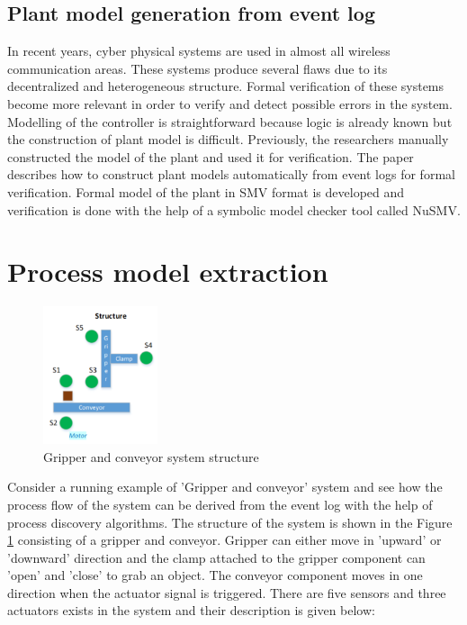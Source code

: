 \documentclass[conference]{IEEEtran}
\begin{document}
\subsection{Plant model generation from event log}

In recent years, cyber physical systems are used in almost all wireless communication areas. These systems produce several flaws due to its decentralized and heterogeneous structure. Formal verification of these systems become more relevant in order to verify and detect possible errors in the system. Modelling of the controller is straightforward because logic is already known but the construction of plant model is difficult. Previously, the researchers manually constructed the model of the plant and used it for verification. The paper \cite{etfapaper} describes how to construct plant models automatically from event logs for formal verification. Formal model of the plant in SMV format is developed and verification is done with the help of a symbolic model checker tool called NuSMV.


\section{Process model extraction}
\label{sec:processmodelextraction}
\begin{figure}[!t]
	\centering
	\includegraphics[width=0.3\textwidth]{images/structure.PNG}
	\caption{Gripper and conveyor system structure}
	\label{fig:structure}
\end{figure}

Consider a running example of  'Gripper and conveyor' system and see how the process flow of the system can be derived from the event log with the help of process discovery algorithms. The structure of the system is shown in the Figure \ref{fig:structure} consisting of a gripper and conveyor. Gripper can either move in 'upward' or 'downward' direction and the clamp attached to the gripper component can 'open' and 'close' to grab an object. The conveyor component moves in one direction when the actuator signal is triggered. There are five sensors and three actuators exists in the system and their description is given below:
\end{document}
